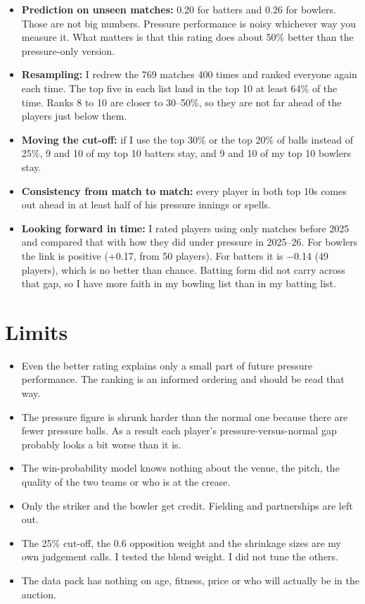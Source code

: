 \documentclass[10.5pt,a4paper]{article}
\begin{document}
\begin{itemize}
\item \textbf{Prediction on unseen matches:} 0.20 for batters and 0.26 for bowlers. Those are not big numbers. Pressure performance is noisy whichever way you measure it. What matters is that this rating does about 50\% better than the pressure-only version.
\item \textbf{Resampling:} I redrew the 769 matches 400 times and ranked everyone again each time. The top five in each list land in the top 10 at least 64\% of the time. Ranks 8 to 10 are closer to 30--50\%, so they are not far ahead of the players just below them.
\item \textbf{Moving the cut-off:} if I use the top 30\% or the top 20\% of balls instead of 25\%, 9 and 10 of my top 10 batters stay, and 9 and 10 of my top 10 bowlers stay.
\item \textbf{Consistency from match to match:} every player in both top 10s comes out ahead in at least half of his pressure innings or spells.
\item \textbf{Looking forward in time:} I rated players using only matches before 2025 and compared that with how they did under pressure in 2025--26. For bowlers the link is positive (+0.17, from 50 players). For batters it is $-$0.14 (49 players), which is no better than chance. Batting form did not carry across that gap, so I have more faith in my bowling list than in my batting list.
\end{itemize}

\section{Limits}

\begin{itemize}
\item Even the better rating explains only a small part of future pressure performance. The ranking is an informed ordering and should be read that way.
\item The pressure figure is shrunk harder than the normal one because there are fewer pressure balls. As a result each player's pressure-versus-normal gap probably looks a bit worse than it is.
\item The win-probability model knows nothing about the venue, the pitch, the quality of the two teams or who is at the crease.
\item Only the striker and the bowler get credit. Fielding and partnerships are left out.
\item The 25\% cut-off, the 0.6 opposition weight and the shrinkage sizes are my own judgement calls. I tested the blend weight. I did not tune the others.
\item The data pack has nothing on age, fitness, price or who will actually be in the auction.
\end{itemize}
\end{document}
